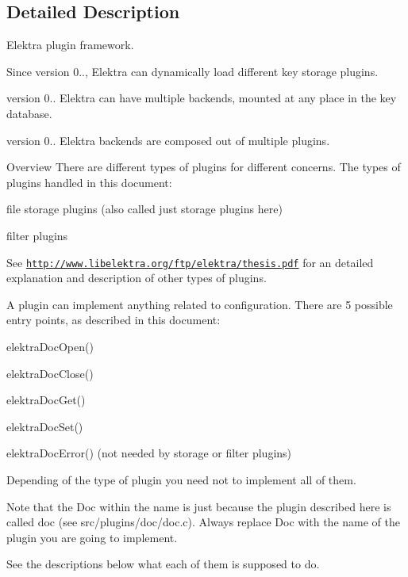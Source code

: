 \subsection{Detailed Description}
Elektra plugin framework. \begin{DoxySince}{Since}
version 0.., Elektra can dynamically load different key storage plugins.

version 0.. Elektra can have multiple backends, mounted at any place in the key database.

version 0.. Elektra backends are composed out of multiple plugins.
\end{DoxySince}
\begin{DoxyParagraph}{Overview}
There are different types of plugins for different concerns. The types of plugins handled in this document\-:
\begin{DoxyItemize}
\item file storage plugins (also called just storage plugins here)
\item filter plugins \par
 See \href{http://www.libelektra.org/ftp/elektra/thesis.pdf}{\tt http\-://www.\-libelektra.\-org/ftp/elektra/thesis.\-pdf} for an detailed explanation and description of other types of plugins. \par
 A plugin can implement anything related to configuration. There are 5 possible entry points, as described in this document\-:
\item elektra\-Doc\-Open()
\item elektra\-Doc\-Close()
\item elektra\-Doc\-Get()
\item elektra\-Doc\-Set()
\item elektra\-Doc\-Error() (not needed by storage or filter plugins) \par
 Depending of the type of plugin you need not to implement all of them. \par
 
\end{DoxyItemize}
\end{DoxyParagraph}
\begin{DoxyNote}{Note}
that the Doc within the name is just because the plugin described here is called doc (see src/plugins/doc/doc.\-c). Always replace Doc with the name of the plugin you are going to implement.
\end{DoxyNote}
See the descriptions below what each of them is supposed to do.

